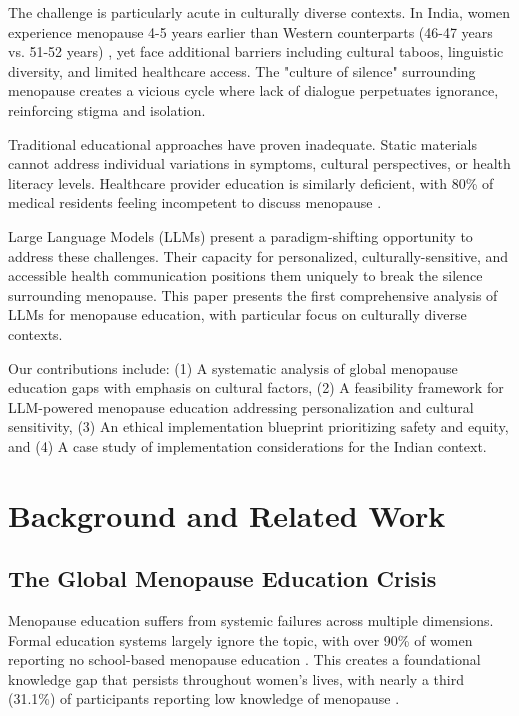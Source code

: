 \documentclass[letterpaper]{article} %
\begin{document}
The challenge is particularly acute in culturally diverse contexts. In India, women experience menopause 4-5 years earlier than Western counterparts (46-47 years vs. 51-52 years) \cite{ijogr2023knowledge}, yet face additional barriers including cultural taboos, linguistic diversity, and limited healthcare access. The "culture of silence" surrounding menopause creates a vicious cycle where lack of dialogue perpetuates ignorance, reinforcing stigma and isolation.

Traditional educational approaches have proven inadequate. Static materials cannot address individual variations in symptoms, cultural perspectives, or health literacy levels. Healthcare provider education is similarly deficient, with 80\% of medical residents feeling incompetent to discuss menopause \cite{crmc2023knowledge}.

Large Language Models (LLMs) present a paradigm-shifting opportunity to address these challenges. Their capacity for personalized, culturally-sensitive, and accessible health communication positions them uniquely to break the silence surrounding menopause. This paper presents the first comprehensive analysis of LLMs for menopause education, with particular focus on culturally diverse contexts.

Our contributions include: (1) A systematic analysis of global menopause education gaps with emphasis on cultural factors, (2) A feasibility framework for LLM-powered menopause education addressing personalization and cultural sensitivity, (3) An ethical implementation blueprint prioritizing safety and equity, and (4) A case study of implementation considerations for the Indian context.

\section{Background and Related Work}

\subsection{The Global Menopause Education Crisis}

Menopause education suffers from systemic failures across multiple dimensions. Formal education systems largely ignore the topic, with over 90\% of women reporting no school-based menopause education \cite{ucl2023menopause}. This creates a foundational knowledge gap that persists throughout women's lives, with nearly a third (31.1\%) of participants reporting low knowledge of menopause \cite{mdpi2025knowledge}.
\end{document}
